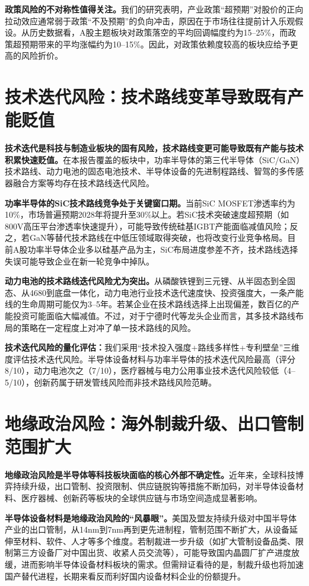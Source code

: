 \textbf{政策风险的不对称性值得关注。}我们的研究表明，产业政策“超预期”对股价的正向拉动效应通常弱于政策“不及预期”的负向冲击，原因在于市场往往提前计入乐观假设。从历史数据看，A股主题板块对政策落空的平均回调幅度约为15--25\%，而政策超预期带来的平均涨幅约为10--15\%。因此，对政策依赖度较高的板块应给予更高的风险折价。

\section{技术迭代风险：技术路线变革导致既有产能贬值}

\textbf{技术迭代是科技与制造业板块的固有风险，技术路线变更可能导致既有产能与技术积累快速贬值。}在本报告覆盖的板块中，功率半导体的第三代半导体（SiC/GaN）技术路线、动力电池的固态电池技术、半导体设备的先进制程路线、智驾的多传感器融合方案等均存在技术路线迭代风险。

\textbf{功率半导体的SiC技术路线竞争处于关键窗口期。}当前SiC MOSFET渗透率约为10\%，市场普遍预期2028年将提升至30\%以上。若SiC技术突破速度超预期（如800V高压平台渗透率快速提升），可能导致传统硅基IGBT产能面临减值风险；反之，若GaN等替代技术路线在中低压领域取得突破，也将改变行业竞争格局。目前A股功率半导体企业多以硅基产品为主，SiC布局进度参差不齐，技术路线选择失误可能导致企业在新一轮竞争中掉队。

\textbf{动力电池的技术路线迭代风险尤为突出。}从磷酸铁锂到三元锂、从半固态到全固态、从4680到底盘一体化，动力电池行业技术迭代速度快、投资强度大，一条产能线的生命周期可能仅为3--5年。若某企业在技术路线选择上出现偏差，数百亿的产能投资可能面临大幅减值。不过，对于宁德时代等龙头企业而言，其多技术路线布局的策略在一定程度上对冲了单一技术路线的风险。

\textbf{技术迭代风险的量化评估：}我们采用“技术投入强度+路线多样性+专利壁垒”三维度评估技术迭代风险。半导体设备材料与功率半导体的技术迭代风险最高（评分8/10），动力电池次之（7/10），医疗器械与电力公用事业技术迭代风险较低（4--5/10），创新药属于研发管线风险而非技术路线风险范畴。

\section{地缘政治风险：海外制裁升级、出口管制范围扩大}

\textbf{地缘政治风险是半导体等科技板块面临的核心外部不确定性。}近年来，全球科技博弈持续升级，出口管制、投资限制、供应链脱钩等措施不断加码，对半导体设备材料、医疗器械、创新药等板块的全球供应链与市场空间造成显著影响。

\textbf{半导体设备材料是地缘政治风险的“风暴眼”。}美国及盟友持续升级对中国半导体产业的出口管制，从14nm到7nm再到更先进制程，管制范围不断扩大，从设备延伸至材料、软件、人才等多个维度。若制裁进一步升级（如扩大管制设备品类、限制第三方设备厂对中国出货、收紧人员交流等），可能导致国内晶圆厂扩产进度放缓，进而影响半导体设备材料板块的需求。但需辩证看待的是，制裁升级也将加速国产替代进程，长期来看反而利好国内设备材料企业的份额提升。

